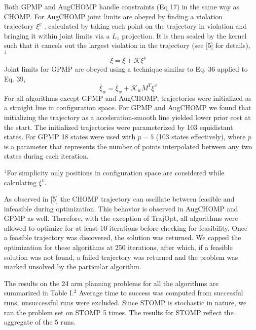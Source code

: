 \documentclass{IEEEtran}
\begin{document}
Both GPMP and AugCHOMP handle constraints (Eq 17)
in the same way as CHOMP. For AugCHOMP joint limits
are obeyed by finding a violation trajectory $\xi^v$
, calculated by
taking each point on the trajectory in violation and bringing
it within joint limits via a $L_1$ projection. It is then scaled by
the kernel such that it cancels out the largest violation in the
trajectory (see [5] for details),${}^1$
\begin{equation*}
\overline{\xi}=\overline{\xi}+\mathcal{K}\xi^v
\tag{39}
\end{equation*}
Joint limits for GPMP are obeyed using a technique similar
to Eq. 36 applied to Eq. 39,
\begin{equation*}
\overline{\xi}_w=\overline{\xi}_w+\mathcal{K}_wM^T\xi^v
\tag{40}
\end{equation*}
For all algorithms except GPMP and AugCHOMP, trajectories were initialized as a straight line in configuration space.
For GPMP and AugCHOMP we found that initializing the
trajectory as a acceleration-smooth line yielded lower prior
cost at the start. The initialized trajectories were parameterized by 103 equidistant states. For GPMP 18 states were used
with $p = 5$ (103 states effectively), where $p$ is a parameter
that represents the number of points interpolated between
any two states during each iteration.

${}^1$For simplicity only positions in configuration space are considered while
calculating $\xi^v$.

As observed in [5] the CHOMP trajectory can oscillate
between feasible and infeasible during optimization. This
behavior is observed in AugCHOMP and GPMP as well.
Therefore, with the exception of TrajOpt, all algorithms were
allowed to optimize for at least 10 iterations before checking
for feasibility. Once a feasible trajectory was discovered, the
solution was returned. We capped the optimization for these
algorithms at 250 iterations, after which, if a feasible solution
was not found, a failed trajectory was returned and the
problem was marked unsolved by the particular algorithm.

The results on the 24 arm planning problems for all the
algorithms are summarized in Table I.${}^2$ Average time to
success was computed from successful runs, unsuccessful
runs were excluded. Since STOMP is stochastic in nature,
we ran the problem set on STOMP 5 times. The results for
STOMP reflect the aggregate of the 5 runs.
\end{document}
